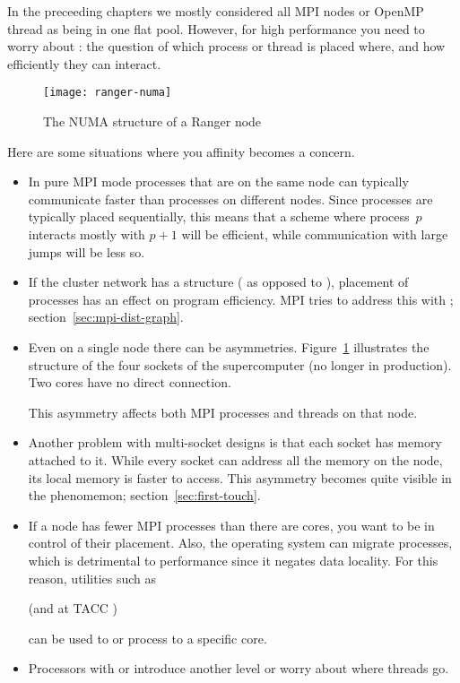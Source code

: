 
In the preceeding chapters we mostly considered all MPI nodes or
OpenMP thread as being in one flat pool.
However, for high performance you need to worry about :
the question of which process or thread is placed where, and how
efficiently they can interact.

\begin{figure}[ht]
  \texttt{[image: ranger-numa]}
  \caption{The NUMA structure of a Ranger node}
  \label{fig:ranger-numa}
\end{figure}

Here are some situations where you affinity becomes a concern.
\begin{itemize}
\item In pure MPI mode processes that are on the same node can
  typically communicate faster than processes on different
  nodes. Since processes are typically placed sequentially, this means
  that a scheme where process~$p$ interacts mostly with $p+1$ will be
  efficient, while communication with large jumps will be less so.
\item If the cluster network has a structure
  ( as opposed to ),
  placement of processes has an effect on program efficiency.  MPI
  tries to address this with ;
  section~\ref{sec:mpi-dist-graph}.
\item Even on a single node there can be
  asymmetries. Figure~\ref{fig:ranger-numa} illustrates the structure
  of the four sockets of the  supercomputer (no
  longer in production). Two cores have no direct connection.

  This asymmetry affects both MPI processes and threads on that node.
\item Another problem with multi-socket designs is that each socket
  has memory attached to it. While every socket can address all the
  memory on the node, its local memory is faster to access. This
  asymmetry becomes quite visible in the 
  phenomemon; section~\ref{sec:first-touch}.
\item If a node has fewer MPI processes than there are cores, you want
  to be in control of their placement. Also, the operating system can
  migrate processes, which is detrimental to performance since it
  negates data locality. For this reason, utilities such as
\begin{tacc}
(and at TACC )    
\end{tacc}
  can be used to  or process to a specific core.
\item Processors with  or
   introduce another level or worry
  about where threads go.
\end{itemize}

